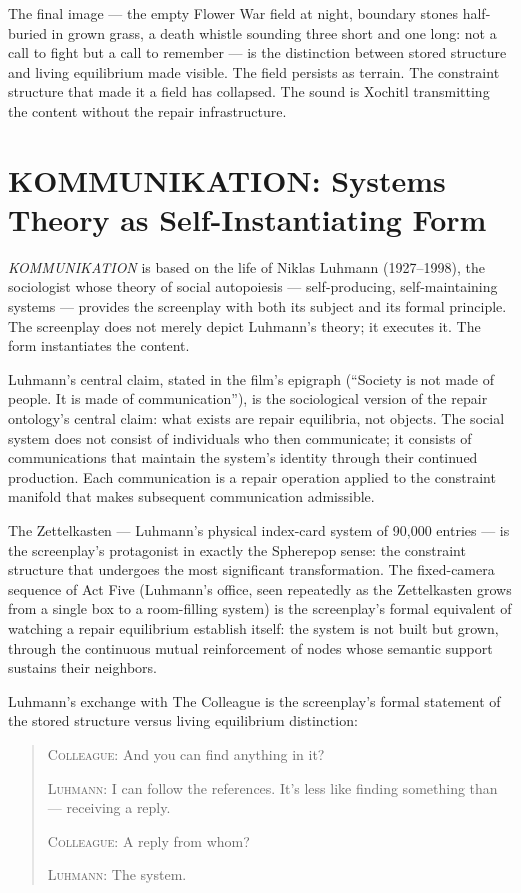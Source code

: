 \documentclass[11pt, a4paper]{article}
\theoremstyle{definition}
\theoremstyle{remark}
\begin{document}
The final image --- the empty Flower War field at night, boundary stones
half-buried in grown grass, a death whistle sounding three short and one long:
not a call to fight but a call to remember --- is the distinction between
stored structure and living equilibrium made visible. The field persists as
terrain. The constraint structure that made it a field has collapsed. The sound
is Xochitl transmitting the content without the repair infrastructure.

\section{KOMMUNIKATION: Systems Theory as Self-Instantiating Form}

\textit{KOMMUNIKATION} is based on the life of Niklas Luhmann (1927--1998),
the sociologist whose theory of social autopoiesis --- self-producing,
self-maintaining systems --- provides the screenplay with both its subject
and its formal principle. The screenplay does not merely depict Luhmann's
theory; it executes it. The form instantiates the content.

Luhmann's central claim, stated in the film's epigraph (``Society is not made
of people. It is made of communication''), is the sociological version of the
repair ontology's central claim: what exists are repair equilibria, not objects.
The social system does not consist of individuals who then communicate; it
consists of communications that maintain the system's identity through their
continued production. Each communication is a repair operation applied to the
constraint manifold that makes subsequent communication admissible.

The Zettelkasten --- Luhmann's physical index-card system of 90,000 entries
--- is the screenplay's protagonist in exactly the Spherepop sense: the
constraint structure that undergoes the most significant transformation. The
fixed-camera sequence of Act Five (Luhmann's office, seen repeatedly as the
Zettelkasten grows from a single box to a room-filling system) is the
screenplay's formal equivalent of watching a repair equilibrium establish
itself: the system is not built but grown, through the continuous mutual
reinforcement of nodes whose semantic support sustains their neighbors.

Luhmann's exchange with The Colleague is the screenplay's formal statement
of the stored structure versus living equilibrium distinction:

\begin{quote}
\textsc{Colleague:} And you can find anything in it?

\textsc{Luhmann:} I can follow the references. It's less like finding
something than --- receiving a reply.

\textsc{Colleague:} A reply from whom?

\textsc{Luhmann:} The system.
\end{quote}
\end{document}
